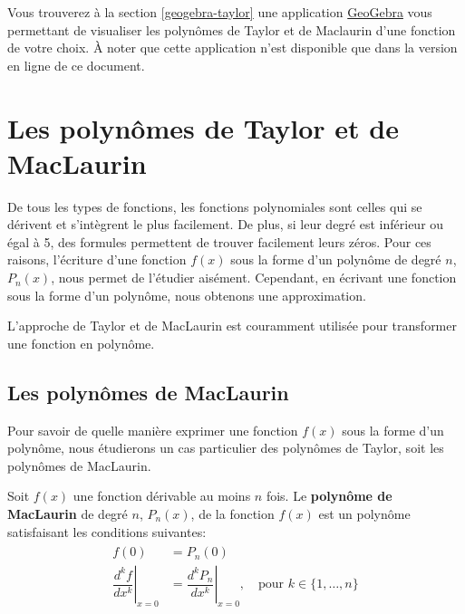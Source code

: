 \documentclass[]{book}
\theoremstyle{definition}
\theoremstyle{definition}
\theoremstyle{definition}
\theoremstyle{remark}
\let\BeginKnitrBlock\begin \let\EndKnitrBlock\end
\begin{document}
Vous trouverez à la section \ref{geogebra-taylor} une application
\href{https://www.geogebra.org/?lang=fr}{GeoGebra} vous permettant de
visualiser les polynômes de Taylor et de Maclaurin d'une fonction de
votre choix. À noter que cette application n'est disponible que dans la
version en ligne de ce document.

\hypertarget{les-polynomes-de-taylor-et-de-maclaurin}{%
\section{Les polynômes de Taylor et de
MacLaurin}\label{les-polynomes-de-taylor-et-de-maclaurin}}

De tous les types de fonctions, les fonctions polynomiales sont celles
qui se dérivent et s'intègrent le plus facilement. De plus, si leur
degré est inférieur ou égal à 5, des formules permettent de trouver
facilement leurs zéros. Pour ces raisons, l'écriture d'une fonction
\(f(x)\) sous la forme d'un polynôme de degré \(n\), \(P_n(x)\), nous
permet de l'étudier aisément. Cependant, en écrivant une fonction sous
la forme d'un polynôme, nous obtenons une approximation.

L'approche de Taylor et de MacLaurin est couramment utilisée pour
transformer une fonction en polynôme.

\hypertarget{les-polynomes-de-maclaurin}{%
\subsection{Les polynômes de
MacLaurin}\label{les-polynomes-de-maclaurin}}

Pour savoir de quelle manière exprimer une fonction \(f(x)\) sous la
forme d'un polynôme, nous étudierons un cas particulier des polynômes de
Taylor, soit les polynômes de MacLaurin.

\BeginKnitrBlock{definition}[Polynôme de Maclaurin]
\protect\hypertarget{def:unnamed-chunk-1}{}{\label{def:unnamed-chunk-1}
{} }Soit \(f(x)\) une fonction
dérivable au moins \(n\) fois. Le \textbf{polynôme de MacLaurin} de
degré \(n\), \(P_n(x)\), de la fonction \(f(x)\) est un polynôme
satisfaisant les conditions suivantes: \begin{align}
\begin{split}
f(0) &= P_n(0) \\
\left.\dfrac{d^k f}{dx^k}\right|_{x=0} &= \left.\dfrac{d^k P_n}{dx^k}\right|_{x=0}, \quad \text{pour } k\in\{1,\ldots,n\}
\end{split}
\end{align}
\EndKnitrBlock{definition}
\end{document}
